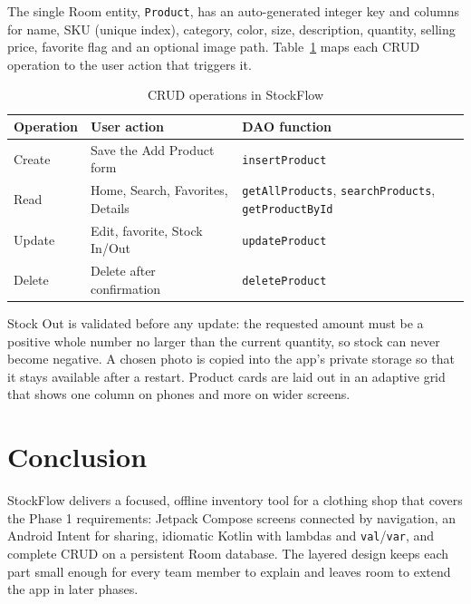 \documentclass[sigconf,nonacm]{acmart}
\begin{document}
The single Room entity, \texttt{Product}, has an auto-generated integer key and
columns for name, SKU (unique index), category, color, size, description, quantity,
selling price, favorite flag and an optional image path. Table~\ref{tab:crud} maps
each CRUD operation to the user action that triggers it.

\begin{table}[h]
\caption{CRUD operations in StockFlow}
\label{tab:crud}
\footnotesize
\begin{tabular}{@{}l>{\raggedright\arraybackslash}p{3.1cm}>{\raggedright\arraybackslash}p{3.3cm}@{}}
\toprule
Operation & User action & DAO function \\
\midrule
Create & Save the Add Product form & \texttt{insertProduct} \\
Read & Home, Search, Favorites, Details & \texttt{getAllProducts}, \texttt{searchProducts}, \texttt{getProductById} \\
Update & Edit, favorite, Stock In/Out & \texttt{updateProduct} \\
Delete & Delete after confirmation & \texttt{deleteProduct} \\
\bottomrule
\end{tabular}
\end{table}

Stock Out is validated before any update: the requested amount must be a positive
whole number no larger than the current quantity, so stock can never become
negative. A chosen photo is copied into the app's private storage so that it stays
available after a restart. Product cards are laid out in an adaptive grid that shows
one column on phones and more on wider screens.

\section{Conclusion}
StockFlow delivers a focused, offline inventory tool for a clothing shop that covers
the Phase 1 requirements: Jetpack Compose screens connected by navigation, an
Android Intent for sharing, idiomatic Kotlin with lambdas and \texttt{val}/\texttt{var},
and complete CRUD on a persistent Room database. The layered design keeps each part
small enough for every team member to explain and leaves room to extend the app in
later phases.



\end{document}
